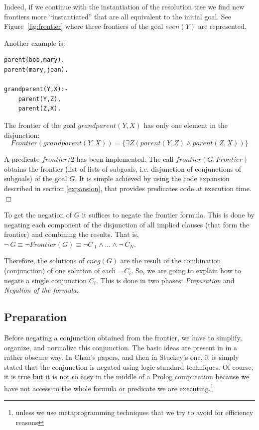 \documentclass{tlp}
\newcommand{\implementation}[1]{\noindent{\sc Implementation details:}
  #1 $\Box$}
\begin{document}
Indeed, if we continue with the instantiation of the resolution tree we find
new frontiers more ``instantiated'' that are all equivalent to the initial
goal. See Figure~\ref{fig:frontier} where three frontiers of the goal
$even(Y)$ are represented.

Another example is:
{
\begin{verbatim}
parent(bob,mary).
parent(mary,joan).

grandparent(Y,X):- 
    parent(Y,Z),
    parent(Z,X).
\end{verbatim}
}

The frontier of the goal $grandparent (Y,X)$ has only one element in the
disjunction:
\[Frontier(grandparent(Y,X)) = \{ \exists Z (parent(Y,Z) \wedge parent(Z,X) ) \} \] 


\noindent
\implementation{A predicate $frontier/2$ has been
implemented. The call $frontier(G,Frontier)$ obtains the frontier (list of
lists of subgoals, i.e. disjunction of conjunctions of subgoals) of the goal
$G$. It is simple achieved by using the code expansion described in 
section \ref{expansion},
that provides predicates code at execution time.}

To get the negation of $G$ it suffices to negate the frontier
formula. This is done by negating each component of the disjunction of
all implied clauses (that form the frontier) and combining the
results. That is, $\neg ~ G \equiv \neg Frontier(G) \equiv \neg C~ _1
\wedge \ldots \wedge \neg~  C_N$.

Therefore, the solutions of $cneg(G)$ are the result of the
combination (conjunction) of one solution of each $\neg ~ C_i$. So, we
are going to explain how to negate a single conjunction $C_i$. This is
done in two phases: \emph{Preparation} and \emph{Negation of the
formula}.




\subsection{Preparation}
\label{preparation}


Before negating a conjunction obtained from the frontier, we have to
simplify, organize, and normalize this conjunction. The basic ideas are
present in \cite{Chan1} in a rather obscure way. In Chan's papers,
and then in Stuckey's one, it is simply stated that the conjunction is negated
using logic standard techniques. Of course, it is true but it is not so
easy in the middle of a Prolog computation because we have not
access to the whole formula or predicate we are executing.\footnote{unless 
we use metaprogramming techniques that we try to avoid for efficiency reasons}
\end{document}
